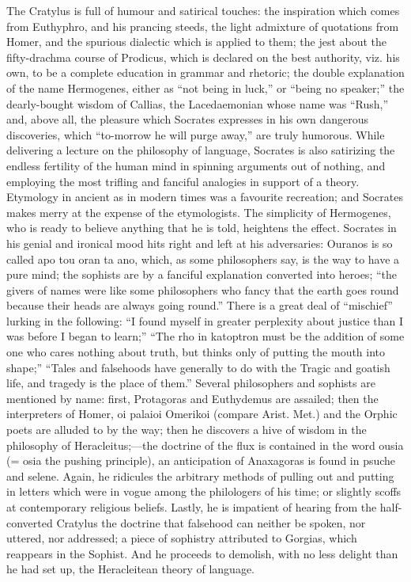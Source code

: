 \documentclass[11pt,letter]{article}
\begin{document}
\par  The Cratylus is full of humour and satirical touches: the inspiration which comes from Euthyphro, and his prancing steeds, the light admixture of quotations from Homer, and the spurious dialectic which is applied to them; the jest about the fifty-drachma course of Prodicus, which is declared on the best authority, viz. his own, to be a complete education in grammar and rhetoric; the double explanation of the name Hermogenes, either as “not being in luck,” or “being no speaker;” the dearly-bought wisdom of Callias, the Lacedaemonian whose name was “Rush,” and, above all, the pleasure which Socrates expresses in his own dangerous discoveries, which “to-morrow he will purge away,” are truly humorous. While delivering a lecture on the philosophy of language, Socrates is also satirizing the endless fertility of the human mind in spinning arguments out of nothing, and employing the most trifling and fanciful analogies in support of a theory. Etymology in ancient as in modern times was a favourite recreation; and Socrates makes merry at the expense of the etymologists. The simplicity of Hermogenes, who is ready to believe anything that he is told, heightens the effect. Socrates in his genial and ironical mood hits right and left at his adversaries: Ouranos is so called apo tou oran ta ano, which, as some philosophers say, is the way to have a pure mind; the sophists are by a fanciful explanation converted into heroes; “the givers of names were like some philosophers who fancy that the earth goes round because their heads are always going round.” There is a great deal of “mischief” lurking in the following: “I found myself in greater perplexity about justice than I was before I began to learn;” “The rho in katoptron must be the addition of some one who cares nothing about truth, but thinks only of putting the mouth into shape;” “Tales and falsehoods have generally to do with the Tragic and goatish life, and tragedy is the place of them.” Several philosophers and sophists are mentioned by name: first, Protagoras and Euthydemus are assailed; then the interpreters of Homer, oi palaioi Omerikoi (compare Arist. Met.) and the Orphic poets are alluded to by the way; then he discovers a hive of wisdom in the philosophy of Heracleitus;—the doctrine of the flux is contained in the word ousia (= osia the pushing principle), an anticipation of Anaxagoras is found in psuche and selene. Again, he ridicules the arbitrary methods of pulling out and putting in letters which were in vogue among the philologers of his time; or slightly scoffs at contemporary religious beliefs. Lastly, he is impatient of hearing from the half-converted Cratylus the doctrine that falsehood can neither be spoken, nor uttered, nor addressed; a piece of sophistry attributed to Gorgias, which reappears in the Sophist. And he proceeds to demolish, with no less delight than he had set up, the Heracleitean theory of language.
\end{document}
